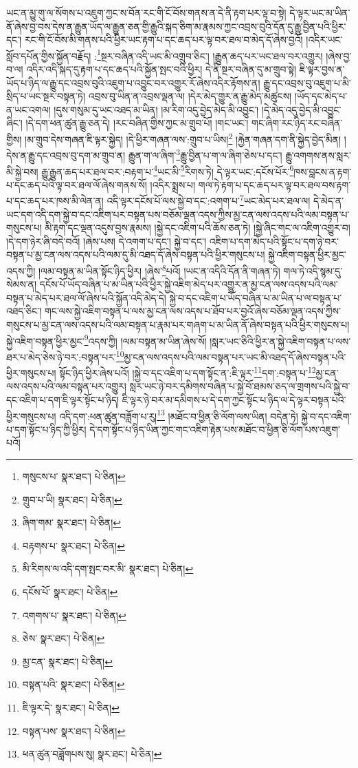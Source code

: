 ཡང་ན་མྱུ་གུ་ལ་སོགས་པ་འཇུག་ཀྱང་ས་བོན་རང་གི་ངོ་བོས་གནས་ན་དེ་ནི་རྟག་པར་ལྟ་བ་སྟེ། དེ་ལྟར་ཡང་མ་ཡིན་ནོ་ཞེས་བྱ་བས་དེས་ན་རྒྱུན་ཡོད་ལ་རྒྱུན་ཅན་གྱི་རྒྱུའི་སྐད་ཅིག་མ་རྣམས་ཀྱང་འབྲས་བུའི་དོན་དུ་རྒྱུ་བྱིན་པའི་ཕྱིར་དང་། རང་གི་ངོ་བོས་མི་གནས་པའི་ཕྱིར་ཡང་རྟག་པ་དང་ཆད་པར་ལྟ་བར་ཐལ་བ་མེད་དོ་ཞེས་བྱའོ། །འདིར་ཡང་སློབ་དཔོན་གྱིས་སྐྱོན་བརྗོད། :\footnote{གསུངས་པ་  སྣར་ཐང་།  པེ་ཅིན། }སྔར་བཞིན་འདི་ཡང་མི་འགྲུབ་ཅིང་། །རྒྱུན་ཆད་པར་ཡང་ཐལ་བར་འགྱུར། །ཞེས་བྱ་བ་ལ། འདིར་འདི་སྐད་དུ་རྟག་པ་དང་ཆད་པའི་སྐྱོན་སྤང་བའི་ཕྱིར། དེ་ནི་སྔར་བཞིན་དུ་མ་གྲུབ་སྟེ། ཇི་ལྟར་བྱས་ན་ཡོད་པ་ཉིད་ལ་རྒྱུ་དང་འབྲས་བུའི་འཇུག་པ་འབྱུང་བར་འགྱུར་རོ་ཞེས་འདིར་རྟོགས་ན། རྒྱུ་དང་འབྲས་བུ་འཇུག་པ་མི་སྲིད་པ་ཡང་སྔར་བསྟན་ཏེ། འབྲས་བུ་ཡིན་ན་འབྲས་ལྡན་ལ། །དེར་མེད་གྱུར་ན་རྒྱུ་མེད་མཚུངས། །ཡོད་དང་མེད་པ་ན་ཡང་འགལ། །དུས་གསུམ་དུ་ཡང་འཐད་མ་ཡིན། །མ་རིག་འདུ་བྱེད་མེད་མི་འབྱུང་། །དེ་མེད་འདུ་བྱེད་མི་འབྱུང་ཞིང་། །དེ་དག་ཕན་ཚུན་རྒྱུ་ཅན་དེ། །རང་བཞིན་གྱིས་ཀྱང་མ་གྲུབ་པོ། །གང་ཡང་། གང་ཞིག་རང་ཉིད་རང་བཞིན་གྱིས། །མ་གྲུབ་དེས་གཞན་ཇི་ལྟར་སྐྱེད། །དེ་ཕྱིར་གཞན་ལས་:གྲུབ་པ་ཡིས།\footnote{གྲུབ་པ་ཡི།  སྣར་ཐང་།  པེ་ཅིན། } །རྐྱེན་གཞན་དག་ནི་སྐྱེད་བྱེད་མིན། །དེས་ན་རྒྱུ་དང་འབྲས་བུ་དག་མ་གྲུབ་ན། རྒྱུན་ག་ལ་ཞིག་\footnote{ཞིག་གམ་  སྣར་ཐང་།  པེ་ཅིན། }རྒྱུ་བྱིན་པ་ག་ལ་ཞིག་ཅེས་པ་དང་། རྒྱུ་འགགས་ནས་སླར་མི་སྐྱེ་བས། རྒྱུ་རྒྱུན་ཆད་པར་ཐལ་བར་:བརྟག་པ་\footnote{བརྟགས་པ་  སྣར་ཐང་།  པེ་ཅིན། }ཡང་མི་\footnote{མི་རིགས་ལ་འདི་དག་སྤང་བར་མི་  སྣར་ཐང་།  པེ་ཅིན། }རིགས་ཏེ། དེ་ལྟར་ཡང་:དངོས་པོར་\footnote{དངོས་པོ་  སྣར་ཐང་།  པེ་ཅིན། }ཁས་བླངས་ན་རྟག་པ་དང་ཆད་པའི་ལྟ་བར་ཐལ་ལོ་ཞེས་གནས་སོ། །འདིར་སྨྲས་པ། གལ་ཏེ་རྟག་པ་དང་ཆད་པར་ལྟ་བར་ཐལ་བས་རྟག་པ་དང་ཆད་པར་ཁས་མི་ལེན་ན། འདི་ལྟར་དངོས་པོ་ལས་སྐྱེ་བ་དང་:འགག་པ་\footnote{འགགས་པ་  སྣར་ཐང་།  པེ་ཅིན། }ཡང་མེད་པར་ཐལ་ལ། དེ་མེད་ན་ཡང་དག་འདི་དག་སྐྱེ་བ་དང་འཇིག་པར་བསྟན་པས་བཅོམ་ལྡན་འདས་ཀྱིས་མྱ་ངན་ལས་འདས་པའི་ལམ་བསྟན་པ་གསུངས་པ། མི་རྟག་དང་ལྡན་འདུས་བྱས་རྣམས། །སྐྱེ་དང་འཇིག་པའི་ཆོས་ཅན་ཏེ། །སྐྱེ་ཞིང་གང་ལ་འཇིག་འགྱུར་བ། །དེ་དག་ཉེར་ཞི་བདེ་བའོ། །ཞེས་པས། དེ་འགག་པ་དང་། སྐྱེ་བ་དང་། འཇིག་པ་དག་མེད་པའི་སྟོང་པ་དག་ཉེ་བར་བསྟན་པ་མྱ་ངན་ལས་འདས་པའི་ལམ་དུ་མི་འཐད་དོ་ཞེས་བསྟན་པའི་ཕྱིར་གསུངས་པ། སྐྱེ་འཇིག་བསྟན་ཕྱིར་མྱང་འདས་ཀྱི། །ལམ་བསྟན་མ་ཡིན་སྟོང་ཉིད་ཕྱིར། །ཞེས་\footnote{ཅེས་  སྣར་ཐང་།  པེ་ཅིན། }པའོ། །ཡང་ན་འདིའི་དོན་ནི་གཞན་ཏེ། གལ་ཏེ་འདི་སྙམ་དུ་སེམས་ན། དངོས་པོ་ཡོད་བཞིན་པ་མ་ཡིན་པའི་ཕྱིར་སྐྱེ་འཇིག་མེད་པར་འགྱུར་ན་མྱ་ངན་ལས་འདས་པའི་ལམ་བསྟན་པ་མེད་པར་ཐལ་ལོ་ཞེས་པའི་སྐྱོན་འདི་མེད་དེ། སྐྱེ་བ་དང་འཇིག་པ་ཡོད་བཞིན་པ་མ་ཡིན་པ་ལ་བསྟན་པ་འཐད་ཅིང་། གང་ལས་སྐྱེ་འཇིག་བསྟན་པ་ལས་མྱ་ངན་ལས་འདས་པ་ཐོབ་པར་བྱའོ་ཞེས་བཅོམ་ལྡན་འདས་ཀྱིས་གསུངས་པ་མྱ་ངན་ལས་འདས་པའི་ལམ་བསྟན་པ་རྣམ་པར་གཞག་པ་མ་ཡིན་ནོ་ཞེས་བསྟན་པའི་ཕྱིར་གསུངས་པ། སྐྱེ་འཇིག་བསྟན་ཕྱིར་མྱང་\footnote{མྱ་ངན་  སྣར་ཐང་།  པེ་ཅིན། }འདས་ཀྱི། །ལམ་བསྟན་མ་ཡིན་ཞེས་སོ། །སླར་ཡང་ཅིའི་ཕྱིར་ན་སྐྱེ་འཇིག་བསྟན་པ་ལས་ཐར་པ་མེད་ཅེས་ཉེ་བར་:བསྟན་པར་\footnote{བསྟན་པའི་  སྣར་ཐང་།  པེ་ཅིན། }མྱ་ངན་ལས་འདས་པའི་ལམ་བསྟན་པར་ཡང་མི་འཐད་དོ་ཞེས་བསྟན་པའི་ཕྱིར་གསུངས་པ། སྟོང་ཉིད་ཕྱིར་ཞེས་པའོ། །སྐྱེ་བ་དང་འཇིག་པ་དག་སྟོང་ན་:ཇི་ལྟར་\footnote{ཇི་ལྟར་དེ་  སྣར་ཐང་།  པེ་ཅིན། }དག་:བསྟན་པ་\footnote{བསྟན་པས་  སྣར་ཐང་།  པེ་ཅིན། }མྱ་ངན་ལས་འདས་པའི་ལམ་བསྟན་པར་འགྱུར། སླར་ཡང་ཉེ་བར་དམིགས་བཞིན་པ་སྐྱེ་བོ་ཐམས་ཅད་ལ་གྲགས་པའི་སྐྱེ་བ་དང་འཇིག་པ་དག་ཇི་ལྟར་སྟོང་པ་ཉིད། ཇི་ལྟར་ཉེ་བར་མ་དམིགས་པ་དེ་དག་ཀྱང་སྟོང་པ་ཉིད་ལ་དེ་ལྟར་བསྟན་པའི་ཕྱིར་གསུངས་པ། འདི་དག་:ཕན་ཚུན་བཟློག་པ་རུ།\footnote{ཕན་ཚུན་བཟློགཔས་སུ།  སྣར་ཐང་།  པེ་ཅིན། } །མཐོང་བ་ཕྱིན་ཅི་ལོག་ལས་ཡིན། བདེན་ཏེ། སྐྱེ་བ་དང་འཇིག་པ་དག་སྟོང་པ་ཉིད་ཀྱི་ཕྱིར། དེ་དག་སྟོང་པ་ཉིད་ཡིན་ཀྱང་གང་འཇིག་རྟེན་པས་མཐོང་བ་ཕྱིན་ཅི་ལོག་པས་འཇུག་པའོ། 